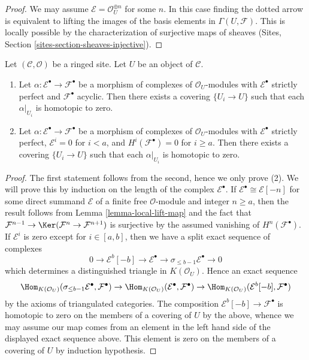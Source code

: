 \begin{proof}
We may assume $\mathcal{E} = \mathcal{O}_U^{\oplus n}$ for some $n$.
In this case finding the dotted arrow is equivalent to lifting the
images of the basis elements in $\Gamma(U, \mathcal{F})$. This is
locally possible by the characterization of surjective maps of
sheaves (Sites, Section \ref{sites-section-sheaves-injective}).
\end{proof}

\begin{lemma}
\label{lemma-local-homotopy}
Let $(\mathcal{C}, \mathcal{O})$ be a ringed site. Let $U$ be an object
of $\mathcal{C}$.
\begin{enumerate}
\item Let $\alpha : \mathcal{E}^\bullet \to \mathcal{F}^\bullet$
be a morphism of complexes of $\mathcal{O}_U$-modules
with $\mathcal{E}^\bullet$ strictly perfect and $\mathcal{F}^\bullet$
acyclic. Then there exists a covering $\{U_i \to U\}$ such that each
$\alpha|_{U_i}$ is homotopic to zero.
\item Let $\alpha : \mathcal{E}^\bullet \to \mathcal{F}^\bullet$
be a morphism of complexes of $\mathcal{O}_U$-modules
with $\mathcal{E}^\bullet$ strictly perfect, $\mathcal{E}^i = 0$
for $i < a$, and $H^i(\mathcal{F}^\bullet) = 0$ for $i \geq a$.
Then there exists a covering $\{U_i \to U\}$ such that each
$\alpha|_{U_i}$ is homotopic to zero.
\end{enumerate}
\end{lemma}

\begin{proof}
The first statement follows from the second, hence we only prove (2).
We will prove this by induction on the length of the complex
$\mathcal{E}^\bullet$. If $\mathcal{E}^\bullet \cong \mathcal{E}[-n]$
for some direct summand $\mathcal{E}$ of a finite free
$\mathcal{O}$-module and integer $n \geq a$, then the result follows from
Lemma \ref{lemma-local-lift-map} and the fact that
$\mathcal{F}^{n - 1} \to \Ker(\mathcal{F}^n \to \mathcal{F}^{n + 1})$
is surjective by the assumed vanishing of $H^n(\mathcal{F}^\bullet)$.
If $\mathcal{E}^i$ is zero except for $i \in [a, b]$, then we have a
split exact sequence of complexes
$$
0 \to \mathcal{E}^b[-b] \to \mathcal{E}^\bullet \to
\sigma_{\leq b - 1}\mathcal{E}^\bullet \to 0
$$
which determines a distinguished triangle in
$K(\mathcal{O}_U)$. Hence an exact sequence
$$
\Hom_{K(\mathcal{O}_U)}(
\sigma_{\leq b - 1}\mathcal{E}^\bullet, \mathcal{F}^\bullet)
\to
\Hom_{K(\mathcal{O}_U)}(\mathcal{E}^\bullet, \mathcal{F}^\bullet)
\to
\Hom_{K(\mathcal{O}_U)}(\mathcal{E}^b[-b], \mathcal{F}^\bullet)
$$
by the axioms of triangulated categories. The composition
$\mathcal{E}^b[-b] \to \mathcal{F}^\bullet$ is homotopic to zero
on the members of a covering of $U$ by the above,
whence we may assume our map comes from an element in the
left hand side of the displayed exact sequence above. This element
is zero on the members of a covering of $U$ by induction hypothesis.
\end{proof}

